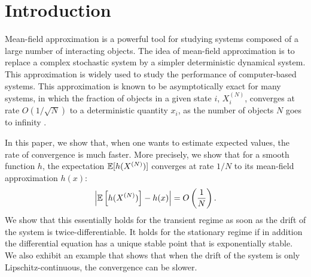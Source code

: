 \documentclass[sigconf]{acmart}
\newcommand\XN{X^{(N)}}
\newcommand\esp[1]{{\mathchoice{\besp{#1}}{\sesp{#1}}{\sesp{#1}}{\sesp{#1}}}}
\newcommand\besp[1]{\mathbb{E}\left[#1\right]}
\newcommand\sesp[1]{\mathbb{E}[#1]}
\newcommand\norm[1]{{\mathchoice{\bnorm{#1}}{\snorm{#1}}{\snorm{#1}}{\snorm{#1}}}}
\newcommand\bnorm[1]{\left\|#1\right\|}
\newcommand\snorm[1]{\|#1\|}
\newcommand\abs[1]{\left|#1\right|}
\newcommand\p[1]{\left(#1\right)}
\begin{document}
\section{Introduction}

Mean-field approximation is a powerful tool for studying systems
composed of a large number of interacting objects. The idea of
mean-field approximation is to replace a complex stochastic system by
a simpler deterministic dynamical system.  This approximation is
widely used to study the performance of computer-based systems.
This approximation is known to be asymptotically exact for many
systems, in which the fraction of objects in a given state $i$,
$\XN_i$, converges at rate $O(1/\sqrt{N})$ to a deterministic quantity
$x_i$, as the number of objects $N$ goes to infinity
\cite{kurtz70,ying2016rate}.



In this paper, we show that, when one wants to estimate expected
values, the rate of convergence is much faster. More precisely, we
show that for a smooth function $h$, the expectation $\esp{h(\XN)}$
converges at rate $1/N$ to its mean-field approximation $h(x)$:
\begin{align}
  \label{eq:1/N}
  \abs{\esp{h(\XN)} - h(x)} = O\p{\frac1N}.
\end{align}
We show that this essentially holds for the transient regime as soon
as the drift of the system is twice-differentiable. It holds for the
stationary regime if in addition the differential equation has a
unique stable point that is exponentially stable. We also exhibit an
example that shows that when the drift of the system is only
Lipschitz-continuous, the convergence can be slower.
\end{document}
